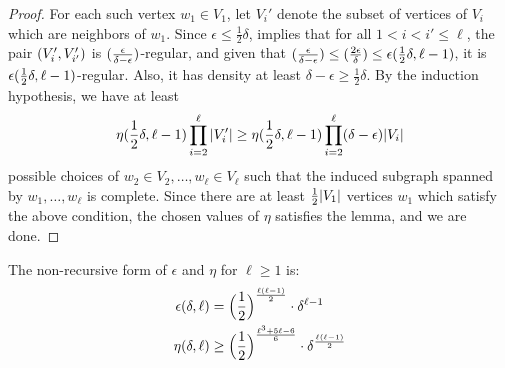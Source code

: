 \begin{lemma}
\begin{proof}
                For each such vertex $w_1 \in V_1$, let $V_i'$ denote the subset of vertices of $V_i$ which are neighbors
                of $w_1$.
                Since $\epsilon \leq \frac{1}{2}\delta$,  implies that for all
                $1 < i < i' \leq \ell$, the pair $( V_i', V_{i'}' )$ is $( \frac{\epsilon}{\delta-\epsilon} )$-regular,
                and given that $( \frac{\epsilon}{\delta-\epsilon} ) \leq ( \frac{2\epsilon}{\delta} ) \leq \epsilon( \frac{1}{2}\delta, \ell-1 )$,
                it is $\epsilon( \frac{1}{2}\delta, \ell-1 )$-regular.
                Also, it has density at least $\delta - \epsilon \geq \frac{1}{2} \delta$.
                By the induction hypothesis, we have at least
                \[
                    \eta ( \frac{1}{2}\delta, \ell-1 ) \prod_{i=2}^\ell | V_i' |
                        \geq \eta ( \frac{1}{2}\delta, \ell-1 ) \prod_{i=2}^\ell ( \delta - \epsilon ) | V_i |
                \]
                possible choices of $w_2 \in V_2, \dots, w_\ell \in V_\ell$ such that the induced subgraph spanned by
                $w_1, \dots, w_\ell$ is complete.
                Since there are at least $\frac{1}{2} | V_1 |$ vertices $w_1$ which satisfy the above condition,
                the chosen values of $\eta$ satisfies the lemma, and we are done.
            \end{proof}
        \end{lemma}

        \begin{remark}
            The non-recursive form of $\epsilon$ and $\eta$ for $\ell \geq 1$ is:
            \begin{align*}
                \epsilon(\delta, \ell) & = \Bigl( \frac{1}{2} \Bigr)^{\frac{\ell(\ell-1)}{2}} \cdot \delta^{\ell-1} \\
                \eta(\delta, \ell) & \geq \Bigl( \frac{1}{2} \Bigr)^{\frac{\ell^3+5\ell-6}{6}} \cdot \delta^{\frac{\ell(\ell-1)}{2}}
            \end{align*}
        \end{remark}

